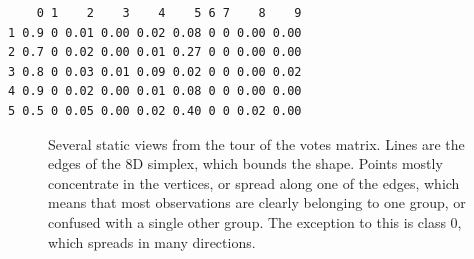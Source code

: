 \documentclass[
  letterpaper,
]{krantz}
\newenvironment{Shaded}{\begin{snugshade}}{\end{snugshade}}
\newcommand{\DecValTok}[1]{\textcolor[rgb]{0.68,0.00,0.00}{#1}}
\newcommand{\FunctionTok}[1]{\textcolor[rgb]{0.28,0.35,0.67}{#1}}
\newcommand{\NormalTok}[1]{\textcolor[rgb]{0.00,0.23,0.31}{#1}}
\newcommand{\SpecialCharTok}[1]{\textcolor[rgb]{0.37,0.37,0.37}{#1}}
\begin{document}
\begin{Shaded}
\end{Shaded}

\begin{verbatim}
    0 1    2    3    4    5 6 7    8    9
1 0.9 0 0.01 0.00 0.02 0.08 0 0 0.00 0.00
2 0.7 0 0.02 0.00 0.01 0.27 0 0 0.00 0.00
3 0.8 0 0.03 0.01 0.09 0.02 0 0 0.00 0.02
4 0.9 0 0.02 0.00 0.01 0.08 0 0 0.00 0.00
5 0.5 0 0.05 0.00 0.02 0.40 0 0 0.02 0.00
\end{verbatim}

\begin{figure}

\begin{minipage}[t]{0.50\linewidth}

{\centering 


}

\end{minipage}%

\caption{\label{fig-ft-votes-pdf}Several static views from the tour of
the votes matrix. Lines are the edges of the 8D simplex, which bounds
the shape. Points mostly concentrate in the vertices, or spread along
one of the edges, which means that most observations are clearly
belonging to one group, or confused with a single other group. The
exception to this is class 0, which spreads in many directions.}

\end{figure}
\end{document}

